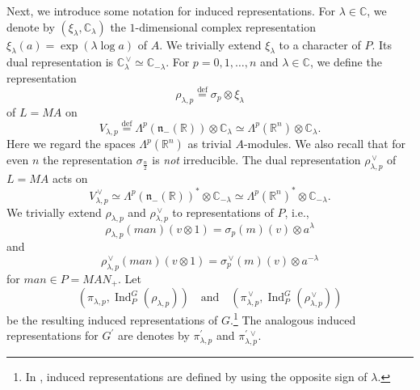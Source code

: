 \documentclass[a4paper,12pt,reqno]{amsart}
\numberwithin{theorem}{subsection}
\numberwithin{equation}{section}
\begin{document}
Next, we introduce some notation for induced representations. For $\lambda\in
{\mathbb{C}}$, we denote by $(\xi_\lambda,{\mathbb{C}}_\lambda)$ the $1$-dimensional complex
representation $\xi_\lambda(a) = \exp (\lambda \log a)$ of $A$. We trivially
extend $\xi_\lambda$ to a character of $P$. Its dual representation is
${\mathbb{C}}^{{\,\vee}}_\lambda\simeq {\mathbb{C}}_{-\lambda}$. For $p=0,1,\dots,n$ and $\lambda \in {\mathbb{C}}$,
we define the representation
$$
   \rho_{\lambda,p} {\stackrel{\text{def}}{=}} \sigma_p \otimes \xi_\lambda
$$
of $L=MA$ on
\begin{equation}\label{defV}
   V_{\lambda,p} {\stackrel{\text{def}}{=}} \Lambda^p ({{\mathfrak n}}_-({\mathbb{R}})) \otimes {\mathbb{C}}_\lambda \simeq \Lambda^p({\mathbb{R}}^{n}) \otimes {\mathbb{C}}_\lambda.
\end{equation}
Here we regard the spaces $\Lambda^p({\mathbb{R}}^n)$ as trivial $A$-modules. We also
recall that for even $n$ the representation $\sigma_{\frac{n}{2}}$ is {\em not}
irreducible. The dual representation $\rho_{\lambda,p}^{{\,\vee}}$ of $L=MA$ acts on
$$
   V_{\lambda,p}^{{\,\vee}} \simeq \Lambda^p ({{\mathfrak n}}_-({\mathbb{R}}))^* \otimes {\mathbb{C}}_{-\lambda} \simeq
   \Lambda^p({\mathbb{R}}^{n})^* \otimes {\mathbb{C}}_{-\lambda}.
$$
We trivially extend $\rho_{\lambda,p}$ and $\rho_{\lambda,p}^{{\,\vee}}$ to
representations of $P$, i.e.,
\begin{equation}\label{eq:IrreRep}
   \rho_{\lambda,p} (man)(v\otimes 1) = \sigma_p(m) (v) \otimes a^{\lambda}
\end{equation}
and
\begin{equation}\label{eq:IrreRep-dual}
   \rho_{\lambda,p}^{{\,\vee}} (man)(v \otimes 1) = \sigma_p^{{\,\vee}} (m) (v) \otimes a^{-\lambda}
\end{equation}
for $man \in P = MAN_+$. Let
$$
   (\pi_{\lambda,p},{\operatorname{Ind}}_P^G(\rho_{\lambda,p})) \quad \mbox{and} \quad
   (\pi_{\lambda,p}^{{\,\vee}},{\operatorname{Ind}}_P^G( \rho_{\lambda,p}^{{\,\vee}}))
$$
be the resulting induced representations of $G$.\footnote{In \cite{Juhl},
induced representations are defined by using the opposite sign of $\lambda$.}
The analogous induced representations for $G^\prime$ are denotes by
$\pi^\prime_{\lambda,p}$ and $\pi_{\lambda,p}^{\prime {{\,\vee}}}$.
\end{document}
